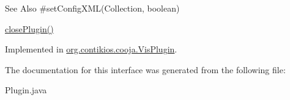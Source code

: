 \begin{DoxySeeAlso}{See Also}
\#set\-Config\-X\-M\-L(\-Collection, boolean) 

\hyperlink{interfaceorg_1_1contikios_1_1cooja_1_1Plugin_a87f92ae1a613ed6f3665a953ab748430}{close\-Plugin()} 
\end{DoxySeeAlso}


Implemented in \hyperlink{classorg_1_1contikios_1_1cooja_1_1VisPlugin_a34e1bee73bd2b86e39bb267f450e624f}{org.\-contikios.\-cooja.\-Vis\-Plugin}.



The documentation for this interface was generated from the following file\-:\begin{DoxyCompactItemize}
\item 
Plugin.\-java\end{DoxyCompactItemize}
